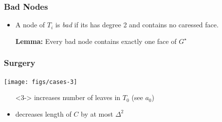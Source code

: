 \documentclass[xcolor=dvipsnames]{beamer}
\newcommand{\dual}[1]{#1^\star}
\begin{document}
\begin{frame}
  \frametitle{Bad Nodes}

  \begin{itemize}
    \item A node of $T_i$ is \emph{bad} if its has degree 2 and contains no caressed face.
    \item[]\textbf{Lemma:} Every bad node contains exactly one face of $\dual{G}$
  \end{itemize}
\end{frame}


\begin{frame}
  \frametitle{Surgery}

  \begin{center}
    \texttt{[image: figs/cases-3]}
  \end{center}
  \begin{itemize}
     \item[<3->] increases number of leaves in $T_0$ 
        (see $a_0$)
     \item decreases length of $C$ by at most $\Delta^2$
  \end{itemize}
\end{frame}




\end{document}
